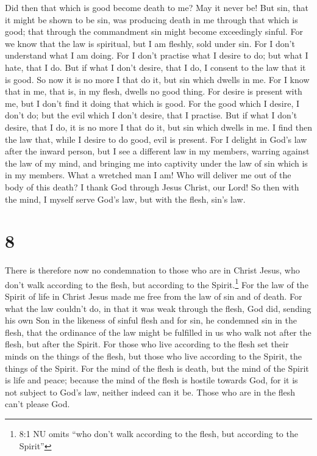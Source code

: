  Did then that which is good become death to me? May it
never be! But sin, that it might be shown to be sin, was producing death
in me through that which is good; that through the commandment sin might
become exceedingly sinful.  For we know that the law is
spiritual, but I am fleshly, sold under sin.  For I don't
understand what I am doing. For I don't practise what I desire to do;
but what I hate, that I do.  But if what I don't desire,
that I do, I consent to the law that it is good.  So now it
is no more I that do it, but sin which dwells in me.  For I
know that in me, that is, in my flesh, dwells no good thing. For desire
is present with me, but I don't find it doing that which is good.
 For the good which I desire, I don't do; but the evil
which I don't desire, that I practise.  But if what I don't
desire, that I do, it is no more I that do it, but sin which dwells in
me.  I find then the law that, while I desire to do good,
evil is present.  For I delight in God's law after the
inward person,  but I see a different law in my members,
warring against the law of my mind, and bringing me into captivity under
the law of sin which is in my members.  What a wretched man
I am! Who will deliver me out of the body of this death?  I
thank God through Jesus Christ, our Lord! So then with the mind, I
myself serve God's law, but with the flesh, sin's law.

\hypertarget{section-7}{%
\section{8}\label{section-7}}

 There is therefore now no condemnation to those who are in
Christ Jesus, who don't walk according to the flesh, but according to
the Spirit.\footnote{8:1 NU omits ``who don't walk according to the
  flesh, but according to the Spirit''}  For the law of the
Spirit of life in Christ Jesus made me free from the law of sin and of
death.  For what the law couldn't do, in that it was weak
through the flesh, God did, sending his own Son in the likeness of
sinful flesh and for sin, he condemned sin in the flesh, 
that the ordinance of the law might be fulfilled in us who walk not
after the flesh, but after the Spirit.  For those who live
according to the flesh set their minds on the things of the flesh, but
those who live according to the Spirit, the things of the Spirit.
 For the mind of the flesh is death, but the mind of the
Spirit is life and peace;  because the mind of the flesh is
hostile towards God, for it is not subject to God's law, neither indeed
can it be.  Those who are in the flesh can't please God.

